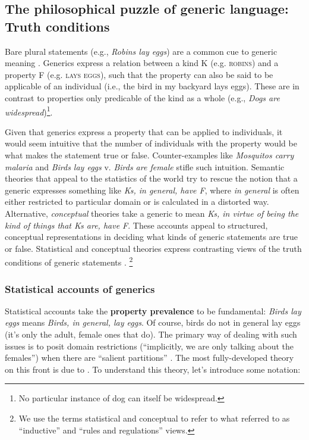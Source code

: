 \documentclass[12pt,letterpaper]{article}
\newcommand{\red}[1]{\textcolor{Red}{#1}}
\begin{document}
\subsection*{The philosophical puzzle of generic language: Truth conditions}

Bare plural statements (e.g., \emph{Robins lay eggs}) are a common cue to generic meaning \cite{Carlson1977}.
Generics express a relation between a kind K (e.g. \textsc{robins}) and a property F (e.g. \textsc{lays eggs}), such that the property can also be said to be applicable of an individual (i.e., the bird in my backyard lays eggs).
These are in contrast to properties only predicable of the kind as a whole (e.g., \emph{Dogs are widespread})\footnote{No particular instance of dog can itself be widespread.}.

Given that generics express a property that can be applied to individuals, it would seem intuitive that the number of individuals with the property would be what makes the statement true or false.
Counter-examples like \emph{Mosquitos carry malaria} and \emph{Birds lay eggs} v. \emph{Birds are female} stifle such intuition. 
Semantic theories that appeal to the statistics of the world try to rescue the notion that a generic expresses something like \emph{Ks, in general, have F}, where \emph{in general} is often either restricted to particular domain or is calculated in a distorted way.
Alternative, \emph{conceptual} theories take a generic to mean \emph{Ks, in virtue of being the kind of things that Ks are, have F}.
These accounts appeal to structured, conceptual representations in deciding what kinds of generic statements are true or false.
Statistical and conceptual theories express contrasting views of the truth conditions of generic statements \cite{Carlson1995essay}. \footnote{We use the terms statistical and conceptual to refer to what  referred to as ``inductive'' and ``rules and regulations'' views.}


\subsubsection*{Statistical accounts of generics}

Statistical accounts take the \textbf{property prevalence} to be fundamental: \emph{Birds lay eggs} means \emph{Birds, in general, lay eggs}. 
Of course, birds do not in general lay eggs (it's only the adult, female ones that do).
The primary way of dealing with such issues is to posit domain restrictions (``implicitly, we are only talking about the females'') when there are ``salient partitions'' \cite{Carlson1995}.
The most fully-developed theory on this front is due to . %
To understand this theory, let's introduce some notation:
\end{document}
